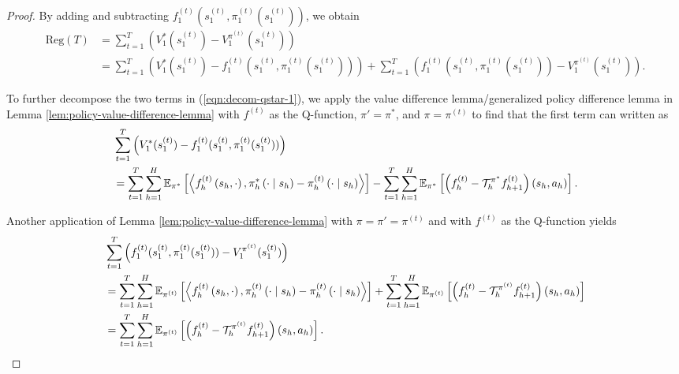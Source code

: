 \begin{proof}
    By adding and subtracting $f_1^{(t)}(s_1^{(t)}, \pi_1^{(t)}(s_1^{(t)}))$, we obtain
    \begin{align}\label{eqn:decom-qstar-1}
        \text{Reg}(T) &= \sum_{t=1}^T\left(V_1^{*}(s_1^{(t)})-V_1^{\pi^{(t)}}(s_1^{(t)})\right) \nonumber\\
        &= \sum_{t=1}^T \left(V_1^{*}(s_1^{(t)})-f_1^{(t)}(s_1^{(t)}, \pi_1^{(t)}(s_1^{(t)}))\right) + \sum_{t=1}^T\left(f_1^{(t)}(s_1^{(t)}, \pi_1^{(t)}(s_1^{(t)}))-V_1^{\pi^{(t)}}(s_1^{(t)})\right) .
    \end{align}
    
    To further decompose the two terms in (\ref{eqn:decom-qstar-1}), we apply the value difference lemma/generalized policy difference lemma in Lemma \ref{lem:policy-value-difference-lemma} \citep{cai2020provably, efroni2020optimisticpolicyoptimizationbandit} with $f^{(t)}$ as the Q-function, $\pi'=\pi^*$, and $\pi = \pi^{(t)}$ to find that the first term can written as
    \begin{align}\label{eqn:decom-qstar-2}
        &\sum_{t=1}^T \left(V_1^{*}(s_1^{(t)})-f_1^{(t)}(s_1^{(t)}, \pi_1^{(t)}(s_1^{(t)}))\right) \nonumber\\
        &= \sum_{t=1}^T \sum_{h=1}^H \mathbb{E}_{\pi^*}\left[\left\langle f_h^{(t)}\left(s_h, \cdot\right), \pi_h^*\left(\cdot \mid s_h\right)-\pi_h^{(t)}\left(\cdot \mid s_h\right)\right\rangle\right] -\sum_{t=1}^T \sum_{h=1}^H\mathbb{E}_{\pi^*}\left[\left(f_h^{(t)}-{\mathcal{T}}_h^{\pi^*}f_{h+1}^{(t)}\right)\left(s_h, a_h\right)\right].
    \end{align}

    Another application of Lemma \ref{lem:policy-value-difference-lemma} with $\pi = \pi' = \pi^{(t)}$ and with $f^{(t)}$ as the Q-function yields
    \begin{align}
        &\sum_{t=1}^T\left(f_1^{(t)}(s_1^{(t)}, \pi_1^{(t)}(s_1^{(t)}))-V_1^{\pi^{(t)}}(s_1^{(t)})\right) \nonumber\\
        &= \sum_{t=1}^T \sum_{h=1}^H \mathbb{E}_{\pi^{(t)}}\left[\left\langle f_h^{(t)}\left(s_h, \cdot\right), \pi_h^{(t)}\left(\cdot \mid s_h\right)-\pi_h^{(t)}\left(\cdot \mid s_h\right)\right\rangle\right] + \sum_{t=1}^T \sum_{h=1}^H\mathbb{E}_{\pi^{(t)}}\left[\left(f_h^{(t)}-{\mathcal{T}}_h^{\pi^{(t)}}f_{h+1}^{(t)}\right)\left(s_h, a_h\right)\right] \nonumber\\
        &=  \sum_{t=1}^T \sum_{h=1}^H\mathbb{E}_{\pi^{(t)}}\left[\left(f_h^{(t)}-{\mathcal{T}}_h^{\pi^{(t)}}f_{h+1}^{(t)}\right)\left(s_h, a_h\right)\right].
    \end{align}


\end{proof}
